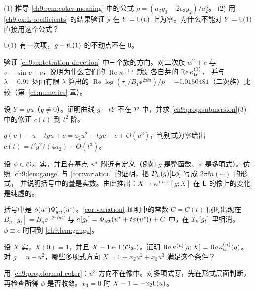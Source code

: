 \begin{exercise}\label{ch9:ex:drho}
(1) 推导 \cref{ch9:rem:coker-meaning} 中的公式 $\dot\rho=(a_2y_3-2a_3y_2)/a_2^3$。
(2) 用 \cref{ch9:ex:L-coefficients} 的结果验证 $\dot\rho$ 在 $Y=\mathsf L(u)$ 上为零。为什么不能对 $Y=\mathsf L(1)$ 直接用这个公式？
\begin{hint}$\mathsf L(1)$ 有一次项，$g-t\mathsf L(1)$ 的不动点不在 $0$。\end{hint}
\end{exercise}

\begin{exercise}\label{ch9:ex:families}
验证 \cref{ch9:ex:tetration-direction} 中三个族的方向。对二次族 $w^2+c$ 与 $v-\sin v+c$，说明为什么它们的 $\operatorname{Re}\kappa^{(1)}$ 就是各自芽的 $\operatorname{Re}\kappa_{\mathrm{tr}}^{(1)}$，
并与 $\lambda=0.97$ 处由有限 $\lambda$ 算出的 $\operatorname{Re}\log(\tau_1/B_1\ee^{2\pi\ii a})/p=-0.0150481$（二次族）比较（第~\ref{ch:numerics} 章）。
\end{exercise}

\begin{exercise}\label{ch9:ex:curve-correction}
设 $Y=yu$（$y\ne0$）。证明曲线 $g-tY$ 不在 $\mathcal P$ 中，并求 \cref{ch9:prop:submersion}(3) 中的修正 $c(t)$ 到 $t^2$ 阶。
\begin{hint}$g(u)-u-tyu+c=a_2u^2-tyu+c+O(u^3)$，判别式为零给出 $c(t)=t^2y^2/(4a_2)+O(t^3)$。\end{hint}
\end{exercise}

\begin{exercise}\label{ch9:ex:gauge-imag}
设 $\phi\in\mathcal O_{2r}$ 实，并且在基点 $u^{*}$ 附近有定义（例如 $g$ 是整函数、$\phi$ 是多项式）。仿照 \cref{ch9:lem:gauge} 与 \cref{cor:variation} 的证明，把 $\mathcal D_n(g)[\mathsf L\phi]$ 写成 $2\pi\ii n(\cdots)$ 的形式，
并说明括号中的量是实数。由此推出：$X\mapsto\kappa^{(n)}[g;X]$ 在 $\mathsf L$ 的像上的变化是纯虚的。
\begin{hint}括号中是 $\phi(u^{*})\Phi_{\mathrm{att}}'(u^{*})$。\cref{cor:variation} 证明中的常数 $C=C(t)$ 同时出现在 $B_n[g_t]=B_n\ee^{-2\pi\ii nC}$ 与
$a[g_t]=\Phi_{\mathrm{att}}(u^{*}+t\phi(u^{*}))+C$ 中，在 $\mathcal I_n[g_t]$ 里相消。$\phi\equiv c$ 时回到 \cref{ch9:lem:gauge}。\end{hint}
\end{exercise}

\begin{exercise}\label{ch9:ex:coboundary-test}
设 $X$ 实，$X(0)=1$，并且 $X-1\in\mathsf L(\mathcal O_{2r})$。证明 $\operatorname{Re}\kappa^{(n)}[g;X]=\operatorname{Re}\kappa_{\mathrm{tr}}^{(n)}(g)$。
对 $g=u+u^2$，哪些多项式方向 $X=1+x_2u^2+x_3u^3$ 满足这个条件？
\begin{hint}用 \cref{ch9:prop:formal-coker}：$u^3$ 方向不在像中。对多项式芽，先在形式层面判断，再检查所得 $\phi$ 是否收敛。$x_3=0$ 时 $X-1=-x_2\mathsf L(u)$。\end{hint}
\end{exercise}

